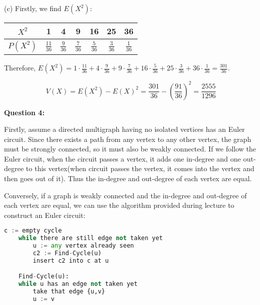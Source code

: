 \documentclass[a4paper,11pt]{article}
\begin{document}
\begin{spacing}{1.4}
    \vspace{10pt}

    (c) Firstly, we find $E(X^2)$:

    \begin{center}
        \begin{tabular}{c|c|c|c|c|c|c}
            \hline
            $X^2$ & 1 & 4 & 9 & 16 & 25 & 36\\\hline
            $P(X^2)$ & $\frac{11}{36}$ & $\frac{9}{36}$ & $\frac{7}{36}$&
            $\frac{5}{36}$ & $\frac{3}{36}$ & $\frac{1}{36}$\\\hline 
        \end{tabular}
    \end{center}
   
    Therefore, $\displaystyle
    E(X^2)=1\cdot \frac{11}{36}+4\cdot \frac{9}{36} +
    9\cdot \frac{7}{36} +16\cdot \frac{5}{36} 
    +25\cdot \frac{3}{36}+36\cdot \frac{1}{36}=\frac{301}{36}.$

    $$V(X)=E(X^2)-E(X)^2=\frac{301}{36}-\left( \frac{91}{36}\right)^2
    =\frac{2555}{1296}$$


    \vspace{20pt}

    \textbf{Question 4:}

    \hspace{2em}
    Firstly, assume a directed multigraph having no isolated vertices
    has an Euler circuit. Since there exists a path from any vertex
    to any other vertex, the graph must be strongly connected, 
    so it must also be weakly connected. If we follow the Euler circuit,
    when the circuit passes a vertex, it adds one in-degree and 
    one out-degree to this vertex(when circuit passes the vertex,
    it comes into the vertex and then goes out of it). Thus 
    the in-degree and out-degree of each vertex are equal.

    \hspace{2em}
    Conversely, if a graph is weakly connected and the in-degree
    and out-degree of each vertex are equal, we can use the 
    algorithm provided during lecture to construct an Euler circuit:

    \newpage
    \begin{tcolorbox}
        \begin{lstlisting}[language=Python]
    c := empty cycle
    while there are still edge not taken yet
        u := any vertex already seen
        c2 := Find-Cycle(u)
        insert c2 into c at u

    Find-Cycle(u):
    while u has an edge not taken yet
        take that edge {u,v}
        u := v
        \end{lstlisting}
    \end{tcolorbox}


\end{spacing}
\end{document}
